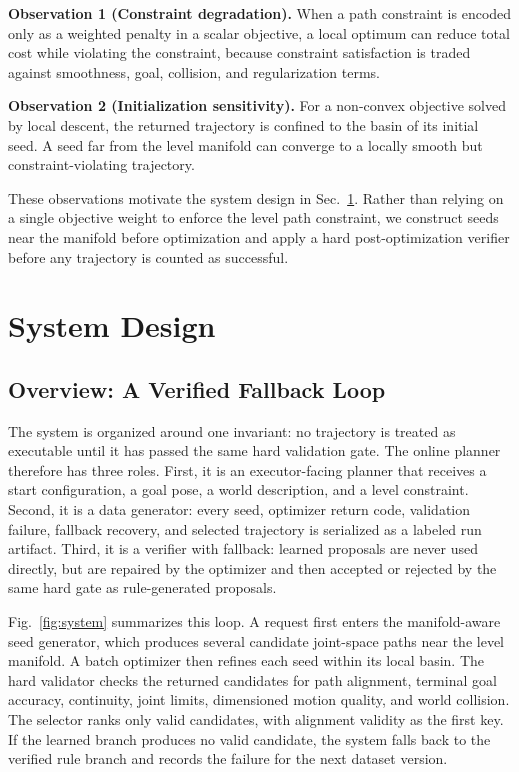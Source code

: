 \documentclass[conference]{IEEEtran/IEEEtran}
\begin{document}
\textbf{Observation 1 (Constraint degradation).} When a path constraint is
encoded only as a weighted penalty in a scalar objective, a local optimum can
reduce total cost while violating the constraint, because constraint
satisfaction is traded against smoothness, goal, collision, and regularization
terms.

\textbf{Observation 2 (Initialization sensitivity).} For a non-convex objective
solved by local descent, the returned trajectory is confined to the basin of its
initial seed. A seed far from the level manifold can converge to a locally
smooth but constraint-violating trajectory.

These observations motivate the system design in Sec.~\ref{sec:method}. Rather
than relying on a single objective weight to enforce the level path constraint,
we construct seeds near the manifold before optimization and apply a hard
post-optimization verifier before any trajectory is counted as successful.

\section{System Design}
\label{sec:method}

\subsection{Overview: A Verified Fallback Loop}
\label{sec:system-overview}
The system is organized around one invariant: no trajectory is treated as
executable until it has passed the same hard validation gate. The online planner
therefore has three roles. First, it is an executor-facing planner that receives
a start configuration, a goal pose, a world description, and a level constraint.
Second, it is a data generator: every seed, optimizer return code, validation
failure, fallback recovery, and selected trajectory is serialized as a labeled
run artifact. Third, it is a verifier with fallback: learned proposals are never
used directly, but are repaired by the optimizer and then accepted or rejected
by the same hard gate as rule-generated proposals.

Fig.~\ref{fig:system} summarizes this loop. A request first enters the
manifold-aware seed generator, which produces several candidate joint-space
paths near the level manifold. A batch optimizer then refines each seed within
its local basin. The hard validator checks the returned candidates for path
alignment, terminal goal accuracy, continuity, joint limits, dimensioned motion
quality, and world collision. The selector ranks only valid candidates, with
alignment validity as the first key. If the learned branch produces no valid
candidate, the system falls back to the verified rule branch and records the
failure for the next dataset version.
\end{document}
